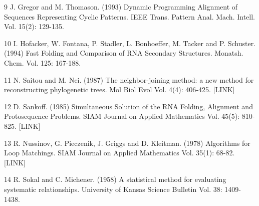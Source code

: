 \documentclass[%
   final,      %
   paper=a4,%
   paper=portrait, %
   pagesize=auto, %
   fontsize=11pt,%
 ]{scrreprt} %
\begin{document}
9
J. Gregor and M. Thomason. (1993) Dynamic Programming Alignment of Sequences Representing Cyclic Patterns. IEEE Trans. Pattern Anal. Mach. Intell. Vol. 15(2): 129-135.

10
I. Hofacker, W. Fontana, P. Stadler, L. Bonhoeffer, M. Tacker and P. Schuster. (1994) Fast Folding and Comparison of RNA Secondary Structures. Monatsh. Chem. Vol. 125: 167-188.

11
N. Saitou and M. Nei. (1987) The neighbor-joining method: a new method for reconstructing phylogenetic trees. Mol Biol Evol Vol. 4(4): 406-425. [LINK]

12
D. Sankoff. (1985) Simultaneous Solution of the RNA Folding, Alignment and Protosequence Problems. SIAM Journal on Applied Mathematics Vol. 45(5): 810-825. [LINK]

13
R. Nussinov, G. Pieczenik, J. Griggs and D. Kleitman. (1978) Algorithms for Loop Matchings. SIAM Journal on Applied Mathematics Vol. 35(1): 68-82. [LINK]

14
R. Sokal and C. Michener. (1958) A statistical method for evaluating systematic relationships. University of Kansas Science Bulletin Vol. 38: 1409-1438.




%
%


%


\end{document}
